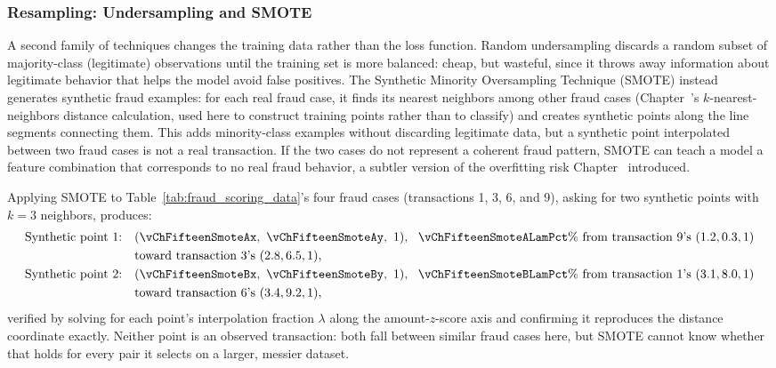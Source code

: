 \documentclass[../ai_in_finance]{subfiles}
\begin{document}
\subsubsection*{Resampling: Undersampling and SMOTE}

A second family of techniques changes the training data rather than the loss function. Random undersampling discards a random subset of majority-class (legitimate) observations until the training set is more balanced: cheap, but wasteful, since it throws away information about legitimate behavior that helps the model avoid false positives. The Synthetic Minority Oversampling Technique (SMOTE) instead generates synthetic fraud examples: for each real fraud case, it finds its nearest neighbors among other fraud cases (Chapter~'s $k$-nearest-neighbors distance calculation, used here to construct training points rather than to classify) and creates synthetic points along the line segments connecting them. This adds minority-class examples without discarding legitimate data, but a synthetic point interpolated between two fraud cases is not a real transaction. If the two cases do not represent a coherent fraud pattern, SMOTE can teach a model a feature combination that corresponds to no real fraud behavior, a subtler version of the overfitting risk Chapter~ introduced.

Applying SMOTE to Table~\ref{tab:fraud_scoring_data}'s four fraud cases (transactions 1, 3, 6, and 9), asking for two synthetic points with $k=3$ neighbors, produces:
\begin{align*}
\text{Synthetic point 1:} &\quad (\vChFifteenSmoteAx,\ \vChFifteenSmoteAy,\ 1), \ \ \vChFifteenSmoteALamPct\% \text{ from transaction 9's } (1.2, 0.3, 1) \\
&\quad \text{toward transaction 3's } (2.8, 6.5, 1), \\
\text{Synthetic point 2:} &\quad (\vChFifteenSmoteBx,\ \vChFifteenSmoteBy,\ 1), \ \ \vChFifteenSmoteBLamPct\% \text{ from transaction 1's } (3.1, 8.0, 1) \\
&\quad \text{toward transaction 6's } (3.4, 9.2, 1),
\end{align*}
verified by solving for each point's interpolation fraction $\lambda$ along the amount-$z$-score axis and confirming it reproduces the distance coordinate exactly. Neither point is an observed transaction: both fall between similar fraud cases here, but SMOTE cannot know whether that holds for every pair it selects on a larger, messier dataset.
\end{document}
